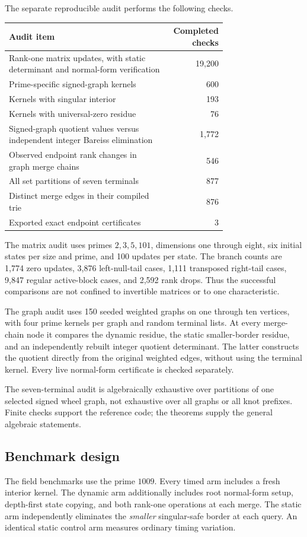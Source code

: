 \documentclass[11pt,letterpaper]{article}
\theoremstyle{definition}\newtheorem{definition}[theorem]{Definition}
\theoremstyle{remark}\newtheorem{remark}[theorem]{Remark}
\begin{document}
The separate reproducible audit performs the following checks.
\begin{center}
\small
\begin{tabular}{p{0.73\linewidth}r}
\toprule
Audit item & Completed checks\\
\midrule
Rank-one matrix updates, with static determinant and normal-form verification & 19,200\\
Prime-specific signed-graph kernels & 600\\
Kernels with singular interior & 193\\
Kernels with universal-zero residue & 76\\
Signed-graph quotient values versus independent integer Bareiss elimination & 1,772\\
Observed endpoint rank changes in graph merge chains & 546\\
All set partitions of seven terminals & 877\\
Distinct merge edges in their compiled trie & 876\\
Exported exact endpoint certificates & 3\\
\bottomrule
\end{tabular}
\end{center}

The matrix audit uses primes $2,3,5,101$, dimensions one through eight, six initial states per size and prime, and 100 updates per state. The branch counts are 1,774 zero updates, 3,876 left-null-tail cases, 1,111 transposed right-tail cases, 9,847 regular active-block cases, and 2,592 rank drops. Thus the successful comparisons are not confined to invertible matrices or to one characteristic.

The graph audit uses 150 seeded weighted graphs on one through ten vertices, with four prime kernels per graph and random terminal lists. At every merge-chain node it compares the dynamic residue, the static smaller-border residue, and an independently rebuilt integer quotient determinant. The latter constructs the quotient directly from the original weighted edges, without using the terminal kernel. Every live normal-form certificate is checked separately.

The seven-terminal audit is algebraically exhaustive over partitions of one selected signed wheel graph, not exhaustive over all graphs or all knot prefixes. Finite checks support the reference code; the theorems supply the general algebraic statements.

\subsection{Benchmark design}
The field benchmarks use the prime $1009$. Every timed arm includes a fresh interior kernel. The dynamic arm additionally includes root normal-form setup, depth-first state copying, and both rank-one operations at each merge. The static arm independently eliminates the \emph{smaller} singular-safe border at each query. An identical static control arm measures ordinary timing variation.
\end{document}
